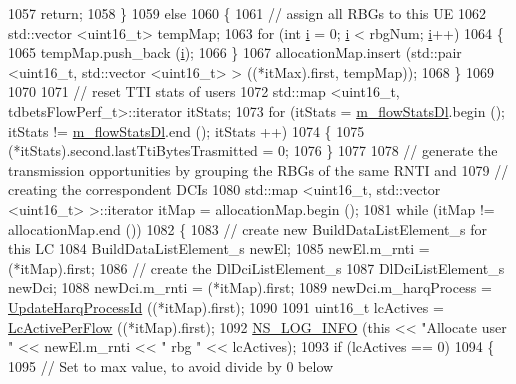 \begin{DoxyCode}
1057       \textcolor{keywordflow}{return};
1058     \}
1059   \textcolor{keywordflow}{else}
1060     \{
1061       \textcolor{comment}{// assign all RBGs to this UE}
1062       std::vector <uint16\_t> tempMap;
1063       \textcolor{keywordflow}{for} (\textcolor{keywordtype}{int} \hyperlink{bernuolliDistribution_8m_a6f6ccfcf58b31cb6412107d9d5281426}{i} = 0; \hyperlink{bernuolliDistribution_8m_a6f6ccfcf58b31cb6412107d9d5281426}{i} < rbgNum; \hyperlink{bernuolliDistribution_8m_a6f6ccfcf58b31cb6412107d9d5281426}{i}++)
1064         \{
1065           tempMap.push\_back (\hyperlink{bernuolliDistribution_8m_a6f6ccfcf58b31cb6412107d9d5281426}{i});
1066         \}
1067       allocationMap.insert (std::pair <uint16\_t, std::vector <uint16\_t> > ((*itMax).first, tempMap));
1068     \}
1069 
1070 
1071   \textcolor{comment}{// reset TTI stats of users}
1072   std::map <uint16\_t, tdbetsFlowPerf\_t>::iterator itStats;
1073   \textcolor{keywordflow}{for} (itStats = \hyperlink{classns3_1_1TdBetFfMacScheduler_a78d90d229bd176d578a607688cdf69a6}{m\_flowStatsDl}.begin (); itStats != \hyperlink{classns3_1_1TdBetFfMacScheduler_a78d90d229bd176d578a607688cdf69a6}{m\_flowStatsDl}.end (); itStats
      ++)
1074     \{
1075       (*itStats).second.lastTtiBytesTrasmitted = 0;
1076     \}
1077 
1078   \textcolor{comment}{// generate the transmission opportunities by grouping the RBGs of the same RNTI and}
1079   \textcolor{comment}{// creating the correspondent DCIs}
1080   std::map <uint16\_t, std::vector <uint16\_t> >::iterator itMap = allocationMap.begin ();
1081   \textcolor{keywordflow}{while} (itMap != allocationMap.end ())
1082     \{
1083       \textcolor{comment}{// create new BuildDataListElement\_s for this LC}
1084       BuildDataListElement\_s newEl;
1085       newEl.m\_rnti = (*itMap).first;
1086       \textcolor{comment}{// create the DlDciListElement\_s}
1087       DlDciListElement\_s newDci;
1088       newDci.m\_rnti = (*itMap).first;
1089       newDci.m\_harqProcess = \hyperlink{classns3_1_1TdBetFfMacScheduler_ad697cf496a65f679059f9fcd0850daa0}{UpdateHarqProcessId} ((*itMap).first);
1090 
1091       uint16\_t lcActives = \hyperlink{classns3_1_1TdBetFfMacScheduler_ad8a61f81356d42a3b622998823a32471}{LcActivePerFlow} ((*itMap).first);
1092       \hyperlink{group__logging_gafbd73ee2cf9f26b319f49086d8e860fb}{NS\_LOG\_INFO} (\textcolor{keyword}{this} << \textcolor{stringliteral}{"Allocate user "} << newEl.m\_rnti << \textcolor{stringliteral}{" rbg "} << lcActives);
1093       \textcolor{keywordflow}{if} (lcActives == 0)
1094         \{
1095           \textcolor{comment}{// Set to max value, to avoid divide by 0 below}

\end{DoxyCode}
